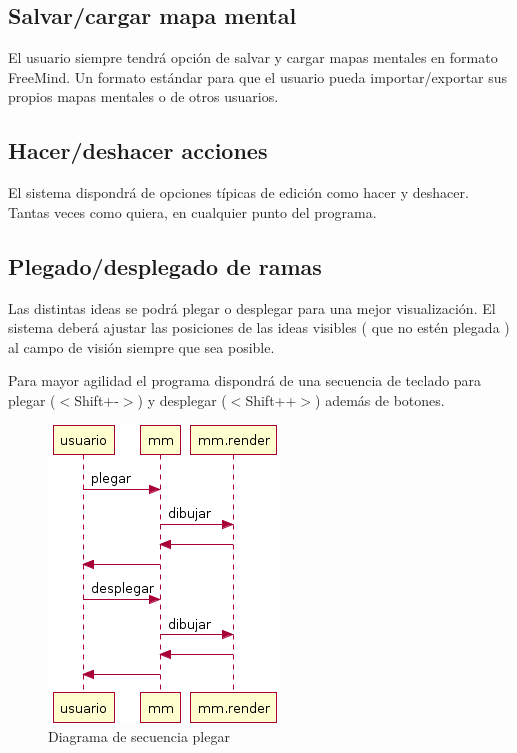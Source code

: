 \subsection{Salvar/cargar mapa mental}
El usuario siempre tendrá opción de salvar y cargar mapas mentales en formato FreeMind. Un formato estándar para que el usuario pueda importar/exportar sus propios mapas mentales o de otros usuarios.

\subsection{Hacer/deshacer acciones}
El sistema dispondrá de opciones típicas de edición como hacer y deshacer. Tantas veces como quiera, en cualquier punto del programa.

\subsection{Plegado/desplegado de ramas}
Las distintas ideas se podrá plegar o desplegar para una mejor visualización. El sistema deberá ajustar las posiciones de las ideas visibles ( que no estén plegada ) al campo de visión siempre que sea posible. 

Para mayor agilidad el programa dispondrá de una secuencia de teclado para plegar ($<$Shift+-$>$) y desplegar ($<$Shift++$>$) además de botones. 

\begin{figure}[tbph]
\centering
\includegraphics[width=0.3\linewidth]{imagenes/diagrama-seq-plegar}
\caption{Diagrama de secuencia plegar}
\label{fig:diagrama-seq-plegar}
\end{figure}


